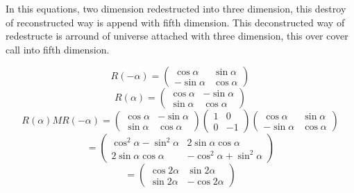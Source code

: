 \documentclass{jsarticle}
\begin{document}
   In this equations, two dimension redestructed into three dimension,
   this destroy of reconstructed way is append with fifth dimension.
   This deconstructed way of redestructe is arround of universe attached
   with three dimension, this over cover call into fifth dimension.

   $$ R(-\alpha) = \begin{pmatrix} \cos \alpha & \sin \alpha \\
   - \sin \alpha & \cos \alpha \end{pmatrix} $$
   $$ R(\alpha) = \begin{pmatrix} \cos \alpha & - \sin \alpha \\
   \sin \alpha & \cos \alpha \end{pmatrix} $$
   $$ R(\alpha)M R(-\alpha) = 
   \begin{pmatrix} \cos \alpha & - \sin \alpha \\
   \sin \alpha & \cos \alpha \end{pmatrix} \begin{pmatrix} 1 & 0 \\
   0 & - 1 \end{pmatrix} \begin{pmatrix} \cos \alpha & \sin \alpha \\
   - \sin \alpha & \cos \alpha \end{pmatrix} $$
   $$ = \begin{pmatrix} \cos^2 \alpha - \sin^2 \alpha & 2 \sin \alpha \cos 
	   \alpha \\
	   2 \sin \alpha \cos \alpha & - \cos^2 \alpha + \sin^2 \alpha
   \end{pmatrix} $$
   $$ = \begin{pmatrix} \cos 2 \alpha & \sin 2 \alpha \\
   \sin 2 \alpha & - \cos 2 \alpha \end{pmatrix} $$
\end{document}

